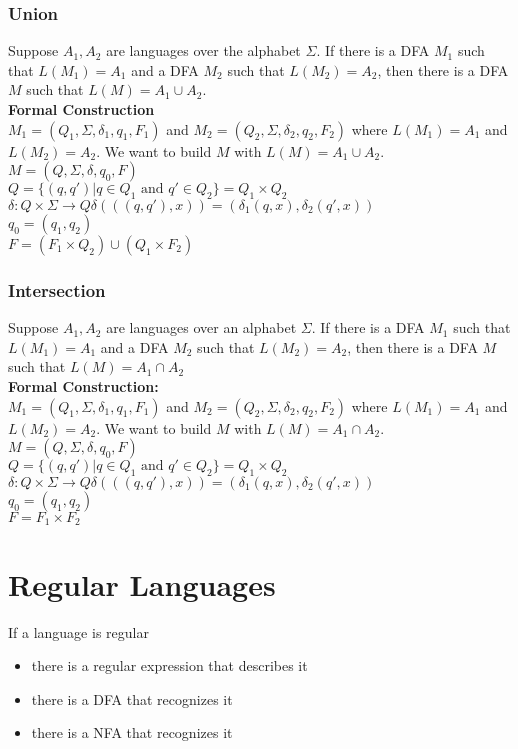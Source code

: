 \documentclass{article}
\begin{document}
\subsubsection{Union}
Suppose $A_1,A_2$ are languages over the alphabet $\Sigma$. If there is a DFA $M_1$ such that $L(M_1)=A_1$ and a DFA $M_2$ such that $L(M_2)=A_2$, then there is a DFA $M$ such that $L(M)=A_1\cup A_2$.\\
\textbf{Formal Construction}\\
$M_1=(Q_1,\Sigma,\delta_1,q_1,F_1)$ and $M_2=(Q_2,\Sigma,\delta_2,q_2,F_2)$ where $L(M_1)=A_1$ and $L(M_2)=A_2$. We want to build $M$ with $L(M)=A_1\cup A_2$.\\
$M=(Q,\Sigma,\delta,q_0,F)$\\
$Q=\{(q,q')\vert q\in Q_1 \text{ and } q'\in Q_2\}=Q_1\times Q_2$\\
$\delta:Q\times\Sigma\rightarrow Q$\hspace*{0.5in}$\delta(((q,q'),x))=(\delta_1(q,x),\delta_2(q',x))$\\
$q_0=(q_1,q_2)$\\
$F=(F_1\times Q_2)\cup(Q_1\times F_2)$
\subsubsection{Intersection}
Suppose $A_1,A_2$ are languages over an alphabet $\Sigma$. If there is a DFA $M_1$ such that $L(M_1)=A_1$ and a DFA $M_2$ such that $L(M_2)=A_2$, then there is a DFA $M$ such that $L(M)=A_1\cap A_2$\\
\textbf{Formal Construction:}\\
$M_1=(Q_1,\Sigma,\delta_1,q_1,F_1)$ and $M_2=(Q_2,\Sigma,\delta_2,q_2,F_2)$ where $L(M_1)=A_1$ and $L(M_2)=A_2$. We want to build $M$ with $L(M)=A_1\cap A_2$.\\
$M=(Q,\Sigma,\delta,q_0,F)$\\
$Q=\{(q,q')\vert q\in Q_1 \text{ and } q'\in Q_2\}=Q_1\times Q_2$\\
$\delta:Q\times\Sigma\rightarrow Q$\hspace*{0.5in}$\delta(((q,q'),x))=(\delta_1(q,x),\delta_2(q',x))$\\
$q_0=(q_1,q_2)$\\
$F=F_1\times F_2$
\section{Regular Languages}
\label{sec:regLanguage}
If a language is regular
\begin{itemize}
    \item there is a regular expression that describes it
    \item there is a DFA that recognizes it
    \item there is a NFA that recognizes it
\end{itemize}
\end{document}
